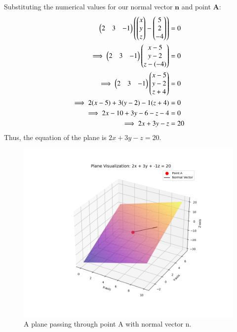 \documentclass[journal]{IEEEtran}
\begin{document}
Substituting the numerical values for our normal vector $\mathbf{n}$ and point $\mathbf{A}$:
\begin{align*}
    \begin{pmatrix}2 & 3 & -1\end{pmatrix} \left( \begin{pmatrix}x\\y\\z\end{pmatrix} - \begin{pmatrix}5\\2\\-4\end{pmatrix} \right) &= 0 \\
    \implies \begin{pmatrix}2 & 3 & -1\end{pmatrix} \begin{pmatrix}x-5\\y-2\\z-(-4)\end{pmatrix} &= 0 \\
    \implies \begin{pmatrix}2 & 3 & -1\end{pmatrix} \begin{pmatrix}x-5\\y-2\\z+4\end{pmatrix} &= 0 \\
    \implies 2(x-5) + 3(y-2) - 1(z+4) &= 0 \\
    \implies 2x - 10 + 3y - 6 - z - 4 &= 0 \\
    \implies 2x + 3y - z &= 20
\end{align*}
Thus, the equation of the plane is $2x + 3y - z = 20$.
\begin{figure}[h!]
\begin{center}
\includegraphics[width=\columnwidth]{figs/fig4.png}
\end{center}
\caption{A plane passing through point A with normal vector n.}
\label{fig:Fig.1}
\end{figure}
\end{document}
